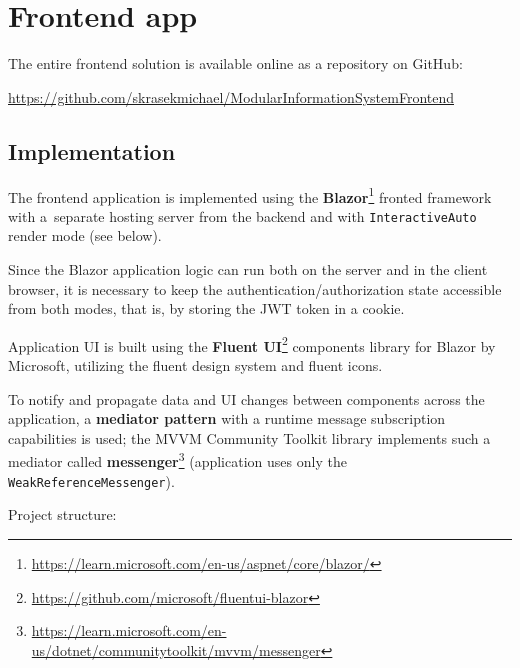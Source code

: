 \section{Frontend app}
\label{dev:frontend}
The entire frontend solution is available online as a repository on GitHub:

\url{https://github.com/skrasekmichael/ModularInformationSystemFrontend}

\subsection{Implementation}
The frontend application is implemented using the \textbf{Blazor}\footnote{\url{https://learn.microsoft.com/en-us/aspnet/core/blazor/}} fronted framework with a~separate hosting server from the backend and with \texttt{InteractiveAuto} render mode (see below).

Since the Blazor application logic can run both on the server and in the client browser, it is necessary to keep the authentication/authorization state accessible from both modes, that is, by storing the JWT token in a cookie.

Application UI is built using the \textbf{Fluent UI}\footnote{\url{https://github.com/microsoft/fluentui-blazor}} components library for Blazor by Microsoft, utilizing the fluent design system and fluent icons.

To notify and propagate data and UI changes between components across the application, a \textbf{mediator pattern} with a runtime message subscription capabilities is used; the MVVM Community Toolkit library implements such a mediator called \textbf{messenger}\footnote{\url{https://learn.microsoft.com/en-us/dotnet/communitytoolkit/mvvm/messenger}} (application uses only the \texttt{WeakReferenceMessenger}).

Project structure: \vspace{6pt}


